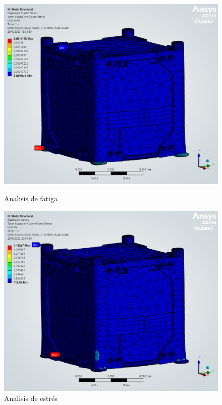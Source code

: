       \begin{figure}[H]
        \begin{minipage}{0.5\textwidth}
          \centering
          \includegraphics[width=\textwidth]{image/fem/ansys_cubesat-static_strain.png}
          \caption{Analisis de fatiga}
          \label{fig:fem_static_strain}
        \end{minipage}
        \begin{minipage}{0.5\textwidth}
          \centering
          \includegraphics[width=\textwidth]{image/fem/ansys_cubesat-static_stress.png}
          \caption{Analisis de estrés}
          \label{fig:fem_static_stress}
        \end{minipage}
      \end{figure}
